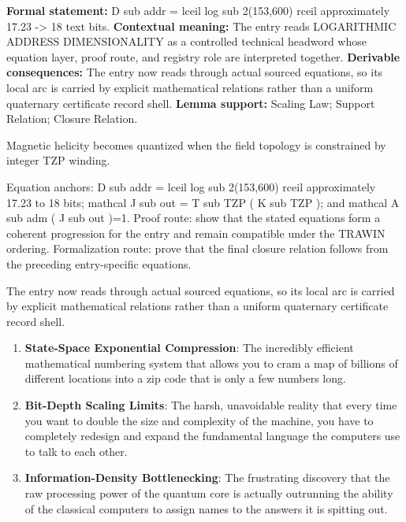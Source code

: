 \begingroup\footnotesize\setlength{\emergencystretch}{3em}\sloppy
\textbf{Formal statement:} D sub addr = lceil log sub 2(153,600) rceil approximately 17.23 -> 18 text bits. \textbf{Contextual meaning:} The entry reads LOGARITHMIC ADDRESS DIMENSIONALITY as a controlled technical headword whose equation layer, proof route, and registry role are interpreted together. \textbf{Derivable consequences:} The entry now reads through actual sourced equations, so its local arc is carried by explicit mathematical relations rather than a uniform quaternary certificate record shell. \textbf{Lemma support:} Scaling Law; Support Relation; Closure Relation.\par
\endgroup

Magnetic helicity becomes quantized when the field topology is constrained by integer TZP winding.

Equation anchors: D sub addr = lceil log sub 2(153,600) rceil approximately 17.23 to 18 bits; mathcal J sub out = T sub TZP ( K sub TZP ); and mathcal A sub adm ( J sub out )=1. Proof route: show that the stated equations form a coherent progression for the entry and remain compatible under the TRAWIN ordering. Formalization route: prove that the final closure relation follows from the preceding entry-specific equations.

The entry now reads through actual sourced equations, so its local arc is carried by explicit mathematical relations rather than a uniform quaternary certificate record shell.
\endgroup

\begin{enumerate}[leftmargin=1.6em,itemsep=6pt,topsep=4pt]
\item \textbf{State-Space Exponential Compression}: The incredibly efficient mathematical numbering system that allows you to cram a map of billions of different locations into a zip code that is only a few numbers long.
\item \textbf{Bit-Depth Scaling Limits}: The harsh, unavoidable reality that every time you want to double the size and complexity of the machine, you have to completely redesign and expand the fundamental language the computers use to talk to each other.
\item \textbf{Information-Density Bottlenecking}: The frustrating discovery that the raw processing power of the quantum core is actually outrunning the ability of the classical computers to assign names to the answers it is spitting out.
\end{enumerate}

